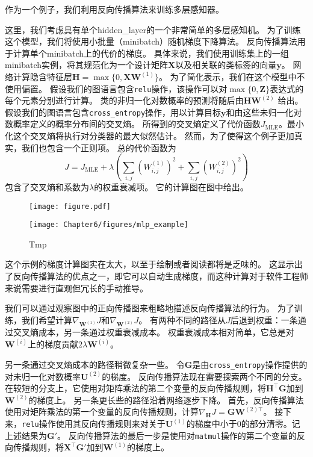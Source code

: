 作为一个例子，我们利用反向传播算法来训练多层感知器。

这里，我们考虑具有单个\gls{hidden_layer}的一个非常简单的多层感知机。
为了训练这个模型，我们将使用小批量（minibatch）随机梯度下降算法。
反向传播算法用于计算单个minibatch上的代价的梯度。
具体来说，我们使用训练集上的一组minibatch实例，将其规范化为一个设计矩阵$\bm{X}$以及相关联的类标签的向量$\bm{y}$。
网络计算隐含特征层$\bm{H}=\max\{0, \bm{X}\bm{W}^{(1)}\}$。
为了简化表示，我们在这个模型中不使用偏置。
假设我们的图语言包含\verb|relu|操作，该操作可以对$\max\{0,\bm{Z}\}$表达式的每个元素分别进行计算。
类的非归一化对数概率的预测将随后由$\bm{H}\bm{W}^{(2)}$ 给出。
假设我们的图语言包含\verb|cross_entropy|操作，用以计算目标$\bm{y}$和由这些未归一化对数概率定义的概率分布间的交叉熵。
所得到的交叉熵定义了代价函数$J_\text{MLE}$。最小化这个交叉熵将执行对分类器的最大似然估计。
然而，为了使得这个例子更加真实，我们也包含一个正则项。
总的代价函数为
\begin{equation}
  J = J_{\text{MLE}} + \lambda \left ( \sum_{i, j} (W_{i, j}^{(1)})^2 + \sum_{i, j} (W_{i, j}^{(2)})^2 \right )
\end{equation}
包含了交叉熵和系数为$\lambda$的权重衰减项。
它的计算图在图\label{fig:chap6_mlp_example}中给出。
\begin{figure}[!htb]
\ifOpenSource
\centerline{\texttt{[image: figure.pdf]}}
\else
\centerline{\texttt{[image: Chapter6/figures/mlp\_example]}}
\fi
\caption{Tmp}
\label{fig:chap6_mlp_example}
\end{figure}

这个示例的梯度计算图实在太大，以至于绘制或者阅读都将是乏味的。
这显示出了反向传播算法的优点之一，即它可以自动生成梯度，而这种计算对于软件工程师来说需要进行直观但冗长的手动推导。

我们可以通过观察图\label{fig:chap6_mlp_example}中的正向传播图来粗略地描述反向传播算法的行为。
为了训练，我们希望计算$\nabla_{\bm{W}^{(1)}} J$和$\nabla_{\bm{W}^{(2)}} J$。
有两种不同的路径从$J$后退到权重：一条通过交叉熵成本，另一条通过权重衰减成本。
权重衰减成本相对简单，它总是对$\bm{W}^{(i)}$上的梯度贡献$2\lambda \bm{W}^{(i)}$。
  
  
另一条通过交叉熵成本的路径稍微复杂一些。
令$\bm{G}$是由\verb|cross_entropy|操作提供的对未归一化对数概率$\bm{U}^{(2)}$的梯度。
反向传播算法现在需要探索两个不同的分支。
在较短的分支上，它使用对矩阵乘法的第二个变量的反向传播规则，将$\bm{H}^\top \bm{G}$加到$\bm{W}^{(2)}$的梯度上。
另一条更长些的路径沿着网络逐步下降。
首先，反向传播算法使用对矩阵乘法的第一个变量的反向传播规则，计算$\nabla_{\bm{H}} J = \bm{G}\bm{W}^{(2)\top}$。
接下来，\verb|relu|操作使用其反向传播规则来对关于$\bm{U}^{(1)}$的梯度中小于0的部分清零。记上述结果为$\bm{G}'$。 
反向传播算法的最后一步是使用对\verb|matmul|操作的第二个变量的反向传播规则，将$\bm{X}^\top \bm{G}'$加到$\bm{W}^{(1)}$的梯度上。

